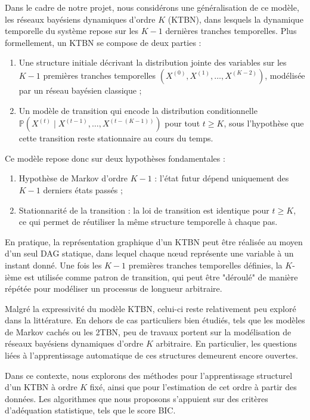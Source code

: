 \documentclass{article}
\begin{document}
Dans le cadre de notre projet, nous considérons une généralisation de ce modèle, les réseaux bayésiens dynamiques d'ordre $K$
(KTBN), dans lesquels la dynamique temporelle du système repose sur les $K-1$ dernières tranches temporelles. Plus
formellement, un KTBN se compose de deux parties :

\begin{enumerate}
    \item Une structure initiale décrivant la distribution jointe des variables sur les $K-1$ premières tranches
          temporelles $(X^{(0)}, X^{(1)}, \dots, X^{(K-2)})$, modélisée par un réseau bayésien classique ;
    \item Un modèle de transition qui encode la distribution conditionnelle
          $\mathbb{P}(X^{(t)} \mid X^{(t-1)}, \dots, X^{(t-(K-1))})$ pour tout $t \geq K$, sous l'hypothèse
          que cette transition reste stationnaire au cours du temps.
\end{enumerate}

Ce modèle repose donc sur deux hypothèses fondamentales :

\begin{enumerate}
    \item Hypothèse de Markov d'ordre $K-1$ : l'état futur dépend uniquement des $K-1$ derniers états passés ;
    \item Stationnarité de la transition : la loi de transition est identique pour $t \geq K$, ce qui permet
          de réutiliser la même structure temporelle à chaque pas.
\end{enumerate}

En pratique, la représentation graphique d'un KTBN peut être réalisée au moyen d'un seul DAG statique, dans
lequel chaque nœud représente une variable à un instant donné. Une fois les $K-1$ premières tranches temporelles
définies, la $K$-ième est utilisée comme patron de transition, qui peut être "déroulé" de manière répétée pour
modéliser un processus de longueur arbitraire.

Malgré la expressivité du modèle KTBN, celui-ci reste relativement peu exploré dans la littérature. En dehors
de cas particuliers bien étudiés, tels que les modèles de Markov cachés ou les 2TBN, peu de travaux portent
sur la modélisation de réseaux bayésiens dynamiques d'ordre $K$ arbitraire. En particulier, les questions liées
à l'apprentissage automatique de ces structures demeurent encore ouvertes.

Dans ce contexte, nous explorons des méthodes pour l'apprentissage structurel d'un KTBN à ordre $K$ fixé,
ainsi que pour l'estimation de cet ordre à partir des données. Les algorithmes que nous proposons s'appuient sur
des critères d'adéquation statistique, tels que le score BIC.
\end{document}

